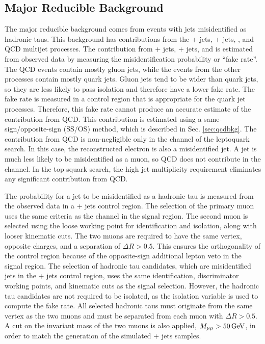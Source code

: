 \subsection{Major Reducible Background
\label{sec:faketaubkg}}

The major reducible background comes from events with jets misidentified as hadronic taus. This background has contributions from the \W + jets, \Z + jets, \ttbar, and QCD multijet processes. The contribution from \W + jets, \Z + jets, and \ttbar is estimated from observed data by measuring the misidentification probability or ``fake rate''. The QCD events contain mostly gluon jets, while the events from the other processes contain mostly quark jets. Gluon jets tend to be wider than quark jets, so they are less likely to pass isolation and therefore have a lower fake rate. The fake rate is measured in a control region that is appropriate for the quark jet processes. Therefore, this fake rate cannot produce an accurate estimate of the contribution from QCD. This contribution is estimated using a same-sign/opposite-sign (SS/OS) method, which is described in Sec. \ref{sec:qcdbkg}. The contribution from QCD is non-negligible only in the \etau channel of the leptoquark search. In this case, the reconstructed electron is also a misidentified jet. A jet is much less likely to be misidentified as a muon, so QCD does not contribute in the \mutau channel. In the top squark search, the high jet multiplicity requirement eliminates any significant contribution from QCD.

The probability for a jet to be misidentified as a hadronic tau is measured from the observed data in a \Zmm + jets control region. The selection of the primary muon uses the same criteria as the \mutau channel in the signal region. The second muon is selected using the loose working point for identification and isolation, along with looser kinematic cuts. The two muons are required to have the same vertex, opposite charges, and a separation of $\Delta R > 0.5$. This ensures the orthogonality of the control region because of the opposite-sign additional lepton veto in the signal region. The selection of hadronic tau candidates, which are misidentified jets in the \Zmm + jets control region, uses the same identification, discriminator working points, and kinematic cuts as the signal selection. However, the hadronic tau candidates are not required to be isolated, as the isolation variable is used to compute the fake rate. All selected hadronic taus must originate from the same vertex as the two muons and must be separated from each muon with $\Delta R > 0.5$. A cut on the invariant mass of the two muons is also applied, $M_{\mu\mu} > 50\,\text{Ge\hspace{-.08em}V}$, in order to match the generation of the simulated \Z + jets samples.

